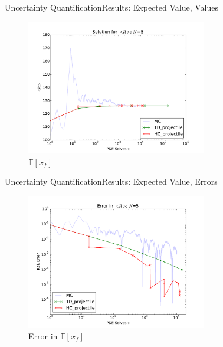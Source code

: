 \documentclass{beamer}
\newcommand{\expv}[1]{\ensuremath{\mathbb{E}[ #1]}}
\begin{document}
\begin{frame}{Uncertainty Quantification}{Results: Expected Value, Values}
  \begin{figure}[h!]
    \centering
      \includegraphics[width=0.7\textwidth]{../graphics/projectile_solns}
      \caption{$\expv{x_f}$}
  \end{figure}
\end{frame}

\begin{frame}{Uncertainty Quantification}{Results: Expected Value, Errors}
  \begin{figure}[h!]
    \centering
      \includegraphics[width=0.7\textwidth]{../graphics/projectile_errs}
      \caption{Error in $\expv{x_f}$}
  \end{figure}
\end{frame}
\end{document}
